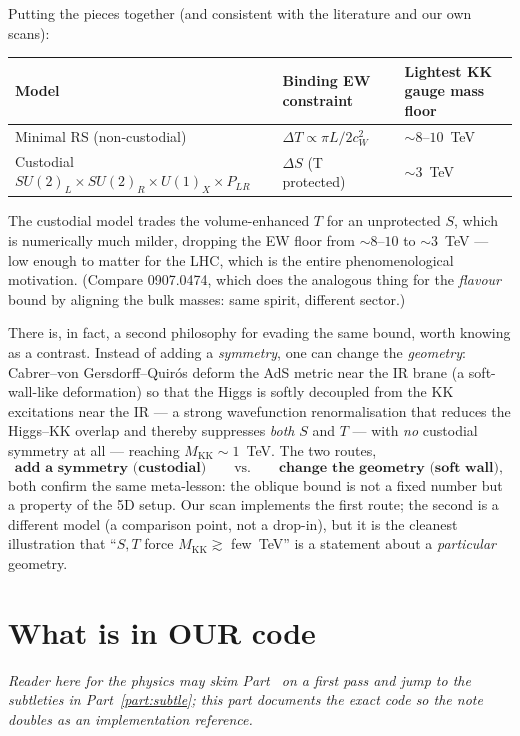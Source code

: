 \documentclass[11pt]{article}
\newcommand{\MKK}{M_{\mathrm{KK}}}
\newcommand{\cwsq}{c_W^2}
\newcommand{\SUL}{SU(2)_L}
\newcommand{\SUR}{SU(2)_R}
\newcommand{\UX}{U(1)_X}
\newcommand{\PLR}{P_{LR}}
\theoremstyle{definition}
\begin{document}
Putting the pieces together (and consistent with the literature and our own
scans):
\begin{center}
\begin{tabular}{lll}
\toprule
Model & Binding EW constraint & Lightest KK gauge mass floor \\
\midrule
Minimal RS (non-custodial) & $\Delta T \propto \pi L/2\cwsq$ & $\sim 8$--$10$~TeV \\
Custodial $\SUL\times\SUR\times\UX\times\PLR$ & $\Delta S$ (T protected) & $\sim 3$~TeV \\
\bottomrule
\end{tabular}
\end{center}
The custodial model trades the volume-enhanced $T$ for an unprotected $S$, which
is numerically much milder, dropping the EW floor from $\sim 8$--$10$ to
$\sim 3$~TeV --- low enough to matter for the LHC, which is the entire
phenomenological motivation. (Compare 0907.0474, which does the analogous thing
for the \emph{flavour} bound by aligning the bulk masses: same spirit, different
sector.)

There is, in fact, a second philosophy for evading the same bound, worth knowing
as a contrast. Instead of adding a \emph{symmetry}, one can change the
\emph{geometry}: Cabrer--von Gersdorff--Quirós deform the AdS metric near the IR
brane (a soft-wall-like deformation) so that the Higgs is softly decoupled from
the KK excitations near the IR --- a strong wavefunction renormalisation that
reduces the Higgs--KK overlap and thereby suppresses \emph{both} $S$ and $T$ ---
with \emph{no} custodial symmetry at all --- reaching $\MKK\sim 1$~TeV. The two
routes,
\[
\textbf{add a symmetry (custodial)} \qquad\text{vs.}\qquad
\textbf{change the geometry (soft wall)},
\]
both confirm the same meta-lesson: the oblique bound is not a fixed number but a
property of the 5D setup. Our scan implements the first route; the second is a
different model (a comparison point, not a drop-in), but it is the cleanest
illustration that ``$S,T$ force $\MKK \gtrsim$ few~TeV'' is a statement about a
\emph{particular} geometry.

\part{What is in OUR code}
\label{part:code}

\emph{Reader here for the physics may skim Part~\ref{part:code} on a first pass
and jump to the subtleties in Part~\ref{part:subtle}; this part documents the
exact code so the note doubles as an implementation reference.}
\end{document}
